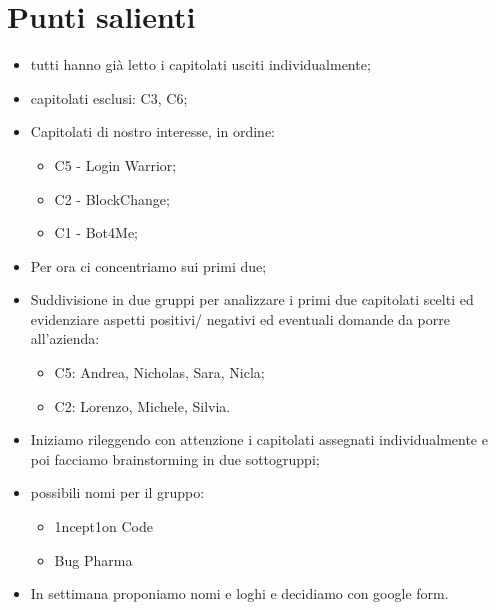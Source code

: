 \documentclass[11pt]{article}
\begin{document}
	\section{Punti salienti}
		\begin{itemize}
			\item tutti hanno già letto i capitolati usciti individualmente;
			\item capitolati esclusi: C3, C6;
			\item Capitolati di nostro interesse, in ordine:
			\begin{itemize}
				\item C5 - Login Warrior;
				\item C2 - BlockChange;
				\item C1 - Bot4Me;
			\end{itemize}
			\item Per ora ci concentriamo sui primi due;
			\item Suddivisione in due gruppi per analizzare i primi due capitolati scelti ed evidenziare aspetti positivi/ negativi ed eventuali domande da porre all’azienda:
				\begin{itemize}
					\item C5: Andrea, Nicholas, Sara, Nicla;
					\item C2: Lorenzo, Michele, Silvia.
				\end{itemize}
			\item Iniziamo rileggendo con attenzione i capitolati assegnati individualmente e poi facciamo brainstorming in due sottogruppi;
			\item possibili nomi per il gruppo:
				\begin{itemize}
					\item 1ncept1on Code
					\item Bug Pharma
				\end{itemize}
			\item In settimana proponiamo nomi e loghi e decidiamo con google form.
		\end{itemize}	
\end{document}
